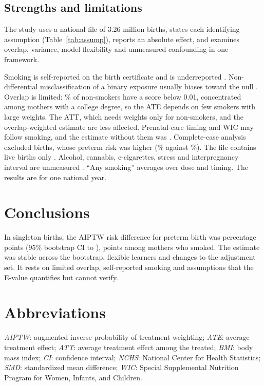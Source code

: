 \documentclass[11pt,letterpaper]{article}
\begin{document}
\subsection*{Strengths and limitations}
The study uses a national file of 3.26 million births, states each identifying assumption (Table~\ref{tab:assump}), reports an absolute effect, and examines overlap, variance, model flexibility and unmeasured confounding in one framework.

Smoking is self-reported on the birth certificate and is underreported \cite{dietz2011,howland2015,searles2014}. Non-differential misclassification of a binary exposure usually biases toward the null \cite{jurek2005}. Overlap is limited: \LowNon{}\% of non-smokers have a score below 0.01, concentrated among mothers with a college degree, so the ATE depends on few smokers with large weights. The ATT, which needs weights only for non-smokers, and the overlap-weighted estimate are less affected. Prenatal-care timing and WIC may follow smoking, and the estimate without them was \RDPre{}. Complete-case analysis excluded \NDropped{} births, whose preterm risk was higher (\DroppedPreterm{}\% against \KeptPreterm{}\%). The file contains live births only \cite{leung2021}. Alcohol, cannabis, e-cigarettes, stress and interpregnancy interval are unmeasured \cite{patra2011,regan2021}. ``Any smoking'' averages over dose and timing. The results are for one national year.

\section*{Conclusions}
In \NTotal{} singleton births, the AIPTW risk difference for preterm birth was \RDmain{} percentage points (95\% bootstrap CI \BootLo{} to \BootHi{}), \ATT{} points among mothers who smoked. The estimate was stable across the bootstrap, flexible learners and changes to the adjustment set. It rests on limited overlap, self-reported smoking and assumptions that the E-value quantifies but cannot verify.

\section*{Abbreviations}
\textit{AIPTW}: augmented inverse probability of treatment weighting; \textit{ATE}: average treatment effect; \textit{ATT}: average treatment effect among the treated; \textit{BMI}: body mass index; \textit{CI}: confidence interval; \textit{NCHS}: National Center for Health Statistics; \textit{SMD}: standardized mean difference; \textit{WIC}: Special Supplemental Nutrition Program for Women, Infants, and Children.
\end{document}
